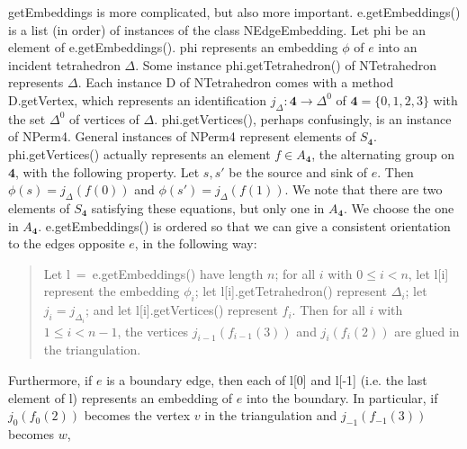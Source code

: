 \documentclass[10pt,twocolumn]{article}%
\theoremstyle{definition}
\begin{document}
\nwendcode{}\nwdocspar
{\Tt{}getEmbeddings\nwendquote} is more complicated, but
also more important. {\Tt{}e.getEmbeddings()\nwendquote} is
a list (in order) of instances of the class {\Tt{}NEdgeEmbedding\nwendquote}.
Let {\Tt{}phi\nwendquote} be an element of {\Tt{}e.getEmbeddings()\nwendquote}. 
{\Tt{}phi\nwendquote} represents an embedding $\phi$ of $e$
into an incident tetrahedron $\Delta$.
\nwenddocs{}\nwdocspar
Some instance {\Tt{}phi.getTetrahedron()\nwendquote} of {\Tt{}NTetrahedron\nwendquote}
represents $\Delta$. Each instance {\Tt{}D\nwendquote} of {\Tt{}NTetrahedron\nwendquote}
comes with a method {\Tt{}D.getVertex\nwendquote}, which
represents an identification 
$j_\Delta:\mathbf{4} \to \Delta^0$
of $\mathbf{4} = \{0,1,2,3\}$ with the set
$\Delta^0$ of vertices of $\Delta$.
\nwenddocs{}\nwdocspar
{\Tt{}phi.getVertices()\nwendquote}, perhaps confusingly,
is an instance of {\Tt{}NPerm4\nwendquote}. General
instances of {\Tt{}NPerm4\nwendquote} represent elements
of $S_{\mathbf{4}}$.
{\Tt{}phi.getVertices()\nwendquote} actually represents an element $f \in A_{\mathbf{4}}$,
the alternating group on $\mathbf{4}$, with the following
property. Let $s,s'$
be the source and sink of $e$. Then $\phi(s) = j_\Delta(f(0))$
and $\phi(s') = j_\Delta(f(1))$. 
\nwenddocs{}\nwdocspar
We note that there are two elements 
of $S_{\mathbf{4}}$ satisfying
these equations, but only one in $A_{\mathbf{4}}$.
We choose the one in $A_{\mathbf{4}}$.
\nwenddocs{}\nwdocspar
{\Tt{}e.getEmbeddings()\nwendquote} is ordered so that we can 
give a consistent orientation to the edges
opposite $e$, in the following way:
\nwenddocs{}\nwdocspar
\begin{quote}
Let {\Tt{}l\ =\ e.getEmbeddings()\nwendquote} have length $n$;
for all $i$ with $0 \leq i < n$, let {\Tt{}l[i]\nwendquote} 
represent the embedding $\phi_i$;
let {\Tt{}l[i].getTetrahedron()\nwendquote} represent $\Delta_i$;
let $j_i = j_{\Delta_i}$; and
let {\Tt{}l[i].getVertices()\nwendquote} represent $f_i$.
Then for all $i$ with $1 \leq i < n - 1$, 
the vertices $j_{i-1}(f_{i-1}(3))$ and $j_{i}(f_{i}(2))$
are glued in the triangulation.
\end{quote}
\nwenddocs{}\nwdocspar
Furthermore, if $e$ is a boundary edge,
then each of {\Tt{}l[0]\nwendquote} and {\Tt{}l[-1]\nwendquote} (i.e. the last
element of {\Tt{}l\nwendquote}) represents an embedding of
$e$ into the boundary. In particular, if
$j_0(f_0(2))$ becomes the vertex $v$ in the
triangulation and $j_{-1}(f_{-1}(3))$ becomes $w$,
\end{document}
